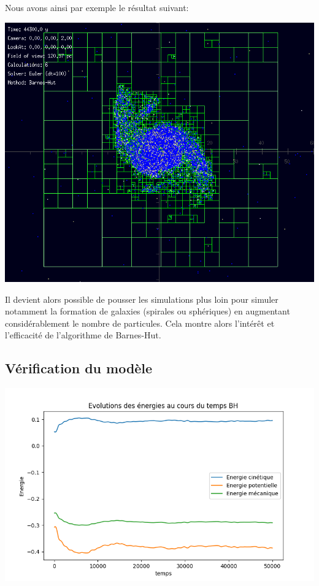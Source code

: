 Nous avons ainsi par exemple le résultat suivant:
\begin{center}
\includegraphics[scale=0.8]{./images/BH_tree.png}
\captionsetup{hypcap=false}
\label{fig7}
\end{center}

Il devient alors possible de pousser les simulations plus loin pour simuler notamment la formation de galaxies (spirales ou sphériques) en augmentant considérablement le nombre de particules. Cela montre alors l'intérêt et l'efficacité de l'algorithme de Barnes-Hut.

\subsection{Vérification du modèle}

\begin{center}
\includegraphics[scale=0.6]{./resultats/Energy_BH.png}
\captionsetup{hypcap=false}
\label{fig9}
\end{center}

